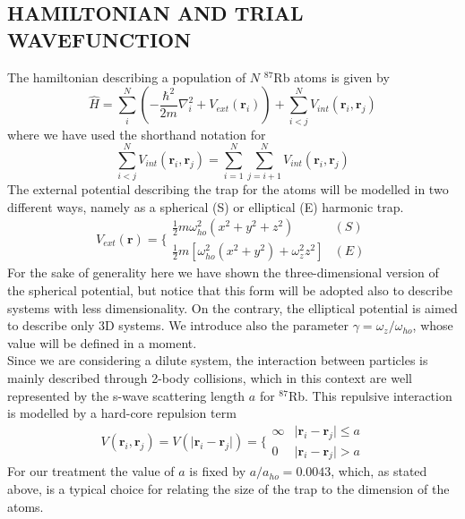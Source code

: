 \subsection{HAMILTONIAN AND TRIAL WAVEFUNCTION}
The hamiltonian describing a population of $N$ $^{87}$Rb atoms is given by
\begin{equation}
    \hat{H} = \sum_i^N \left(-\frac{\hbar^2}{2m}{\nabla}_{i}^2 +V_{ext}({\mathbf{r}}_i)\right)  + \sum_{i<j}^{N} V_{int}({\mathbf{r}}_i,{\mathbf{r}}_j)
    \label{hamiltonian}
\end{equation}
where we have used the shorthand notation for
\begin{equation*}
    \sum_{i<j}^N V_{int}({\mathbf{r}}_i,{\mathbf{r}}_j)  = \sum_{i=1}^N \sum_{j=i+1}^N V_{int}({\mathbf{r}}_i,{\mathbf{r}}_j)
\end{equation*}
The external potential describing the trap for the atoms will be modelled in two different ways, namely as a spherical (S) or elliptical (E) harmonic trap. 
\begin{equation}
    V_{ext}(\mathbf{r}) = \Bigg\{ 
    \begin{array}{ll} \frac{1}{2}m\omega_{ho}^2(x^2 + y^2 + z^2) & (S)\\ \frac{1}{2}m[\omega_{ho}^2(x^2+y^2) + \omega_z^2z^2] & (E) 
\end{array}
\label{potential}
\end{equation}
For the sake of generality here we have shown the three-dimensional version of the spherical potential, but notice that this form will be adopted also to describe systems with less dimensionality. On the contrary, the elliptical potential is aimed to describe only 3D systems. We introduce also the parameter $\gamma= \omega_z / \omega_{ho}$, whose value will be defined in a moment.\\

Since we are considering a dilute system, the interaction between particles is mainly described through 2-body collisions, which in this context are well represented by the s-wave scattering length $a$ for $^{87}$Rb. This repulsive interaction is modelled by a hard-core repulsion term
\begin{equation*}
    V(\bm{r}_i, \bm{r}_j) = V(\vert \bm{r}_i - \bm{r}_j \vert ) = \Bigg\{
    \begin{array}{ll}
        \infty &  \vert \bm{r}_i - \bm{r}_j \vert \leq a \\
        0 & \vert \bm{r}_i - \bm{r}_j \vert > a 
    \end{array}
\end{equation*}
For our treatment the value of $a$ is fixed by $a/a_{ho} = 0.0043$, which, as stated above, is a typical choice for relating the size of the trap to the dimension of the atoms. \\

